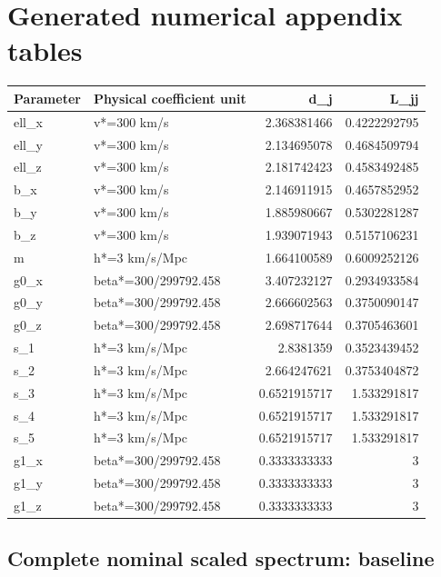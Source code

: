 \documentclass[aps,prd,preprint,onecolumn,notitlepage]{revtex4-2}
\begin{document}
\hypertarget{generated-numerical-appendix-tables}{%
\section{Generated numerical appendix tables}\label{generated-numerical-appendix-tables}}

\begin{longtable}[]{@{}llrr@{}}
\toprule\noalign{}
Parameter & Physical coefficient unit & d\_j & L\_jj \\
\midrule\noalign{}
\endhead
\bottomrule\noalign{}
\endlastfoot
ell\_x & v*=300 km/s & 2.368381466 & 0.4222292795 \\
ell\_y & v*=300 km/s & 2.134695078 & 0.4684509794 \\
ell\_z & v*=300 km/s & 2.181742423 & 0.4583492485 \\
b\_x & v*=300 km/s & 2.146911915 & 0.4657852952 \\
b\_y & v*=300 km/s & 1.885980667 & 0.5302281287 \\
b\_z & v*=300 km/s & 1.939071943 & 0.5157106231 \\
m & h*=3 km/s/Mpc & 1.664100589 & 0.6009252126 \\
g0\_x & beta*=300/299792.458 & 3.407232127 & 0.2934933584 \\
g0\_y & beta*=300/299792.458 & 2.666602563 & 0.3750090147 \\
g0\_z & beta*=300/299792.458 & 2.698717644 & 0.3705463601 \\
s\_1 & h*=3 km/s/Mpc & 2.8381359 & 0.3523439452 \\
s\_2 & h*=3 km/s/Mpc & 2.664247621 & 0.3753404872 \\
s\_3 & h*=3 km/s/Mpc & 0.6521915717 & 1.533291817 \\
s\_4 & h*=3 km/s/Mpc & 0.6521915717 & 1.533291817 \\
s\_5 & h*=3 km/s/Mpc & 0.6521915717 & 1.533291817 \\
g1\_x & beta*=300/299792.458 & 0.3333333333 & 3 \\
g1\_y & beta*=300/299792.458 & 0.3333333333 & 3 \\
g1\_z & beta*=300/299792.458 & 0.3333333333 & 3 \\
\end{longtable}

\hypertarget{complete-nominal-scaled-spectrum-baseline}{%
\subsection{Complete nominal scaled spectrum: baseline}\label{complete-nominal-scaled-spectrum-baseline}}
\end{document}

